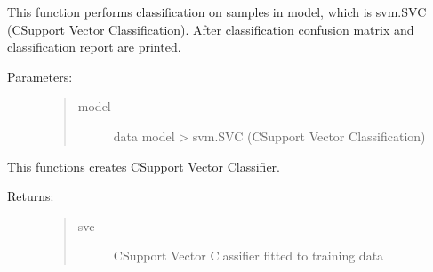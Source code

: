 \documentclass[letterpaper,10pt,english]{sphinxmanual}
\begin{document}
\begin{fulllineitems}
\label{\detokenize{svm:svm.classify}}
\pysigstartsignatures
{}
\pysigstopsignatures
\sphinxAtStartPar
This function performs classification on samples in model, which is svm.SVC (C\sphinxhyphen{}Support Vector Classification).
After classification confusion matrix and classification report are printed.
\begin{description}
\item[{Parameters:}] \leavevmode\begin{quote}\begin{description}
\item[{model}] \leavevmode
\sphinxAtStartPar
data model \textendash{}\textgreater{} svm.SVC (C\sphinxhyphen{}Support Vector Classification)

\end{description}\end{quote}

\end{description}

\end{fulllineitems}


\begin{fulllineitems}
\label{\detokenize{svm:svm.createSvmClassifier}}
\pysigstartsignatures
{}
\pysigstopsignatures
\sphinxAtStartPar
This functions creates C\sphinxhyphen{}Support Vector Classifier.
\begin{description}
\item[{Returns:}] \leavevmode\begin{quote}\begin{description}
\item[{svc}] \leavevmode
\sphinxAtStartPar
C\sphinxhyphen{}Support Vector Classifier fitted to training data

\end{description}\end{quote}

\end{description}

\end{fulllineitems}
\end{document}
